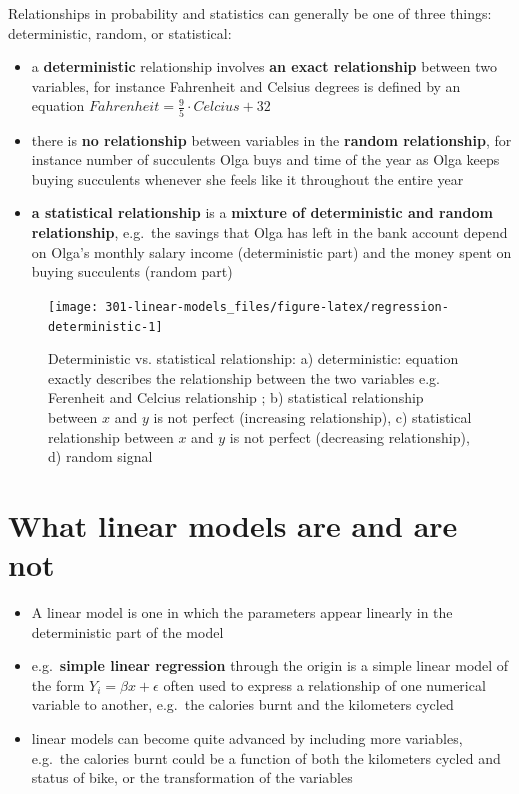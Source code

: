 \documentclass[
]{book}
\providecommand{\tightlist}{%
  \setlength{\itemsep}{0pt}\setlength{\parskip}{0pt}}
\theoremstyle{definition}
\theoremstyle{definition}
\theoremstyle{definition}
\theoremstyle{remark}
\begin{document}
Relationships in probability and statistics can generally be one of three things: deterministic, random, or statistical:

\begin{itemize}
\tightlist
\item
  a \textbf{deterministic} relationship involves \textbf{an exact relationship} between two variables, for instance Fahrenheit and Celsius degrees is defined by an equation \(Fahrenheit=\frac{9}{5}\cdot Celcius+32\)
\item
  there is \textbf{no relationship} between variables in the \textbf{random relationship}, for instance number of succulents Olga buys and time of the year as Olga keeps buying succulents whenever she feels like it throughout the entire year
\item
  \textbf{a statistical relationship} is a \textbf{mixture of deterministic and random relationship}, e.g.~the savings that Olga has left in the bank account depend on Olga's monthly salary income (deterministic part) and the money spent on buying succulents (random part)
\end{itemize}

\begin{figure}

{\centering \texttt{[image: 301-linear-models\_files/figure-latex/regression-deterministic-1]} 

}

\caption{Deterministic vs. statistical relationship: a) deterministic: equation exactly describes the relationship between the two variables e.g. Ferenheit and Celcius relationship ; b) statistical relationship between $x$ and $y$ is not perfect (increasing relationship), c)  statistical relationship between $x$ and $y$ is not perfect (decreasing relationship), d) random signal}\label{fig:regression-deterministic}
\end{figure}

\hypertarget{what-linear-models-are-and-are-not}{%
\section{What linear models are and are not}\label{what-linear-models-are-and-are-not}}

\begin{itemize}
\tightlist
\item
  A linear model is one in which the parameters appear linearly in the deterministic part of the model
\item
  e.g.~\textbf{simple linear regression} through the origin is a simple linear model of the form \(Y_i = \beta x + \epsilon\) often used to express a relationship of one numerical variable to another, e.g.~the calories burnt and the kilometers cycled
\item
  linear models can become quite advanced by including more variables, e.g.~the calories burnt could be a function of both the kilometers cycled and status of bike, or the transformation of the variables
\end{itemize}
\end{document}
